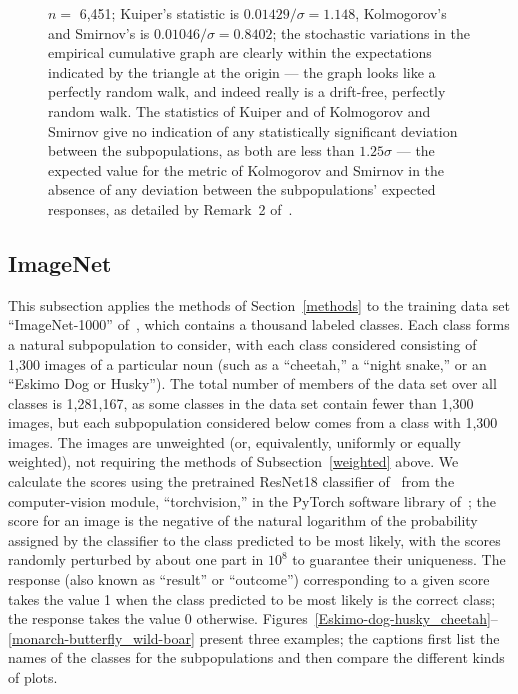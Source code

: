 \documentclass{article}
\begin{document}
\begin{figure}
\begin{centering}
\end{centering}
\caption{$n =$ 6,451; Kuiper's statistic is $0.01429 / \sigma = 1.148$,
         Kolmogorov's and Smirnov's is $0.01046 / \sigma = 0.8402$;
         the stochastic variations in the empirical cumulative graph
         are clearly within the expectations indicated by the triangle
         at the origin --- the graph looks like a perfectly random walk,
         and indeed really is a drift-free, perfectly random walk.
         The statistics of Kuiper and of Kolmogorov and Smirnov
         give no indication of any statistically significant deviation
         between the subpopulations, as both are less than $1.25 \sigma$ ---
         the expected value for the metric of Kolmogorov and Smirnov
         in the absence of any deviation between the subpopulations'
         expected responses, as detailed by Remark~2 of~\cite{tygert}.
}
\label{ex3}
\end{figure}



\subsection{ImageNet}
\label{imagenetex}

This subsection applies the methods of Section~\ref{methods}
to the training data set ``ImageNet-1000'' of~\cite{imagenet},
which contains a thousand labeled classes.
Each class forms a natural subpopulation to consider,
with each class considered consisting of 1,300 images of a particular noun
(such as a ``cheetah,'' a ``night snake,'' or an ``Eskimo Dog or Husky'').
The total number of members of the data set over all classes is 1,281,167,
as some classes in the data set contain fewer than 1,300 images,
but each subpopulation considered below comes from a class with 1,300 images.
The images are unweighted (or, equivalently, uniformly or equally weighted),
not requiring the methods of Subsection~\ref{weighted} above.
We calculate the scores using the pretrained ResNet18 classifier
of~\cite{he-zhang-ren-sun} from the computer-vision module, ``torchvision,''
in the PyTorch software library of~\cite{pytorch};
the score for an image is the negative of the natural logarithm
of the probability assigned by the classifier
to the class predicted to be most likely,
with the scores randomly perturbed by about one part in $10^8$ to guarantee
their uniqueness.
The response (also known as ``result'' or ``outcome'') corresponding
to a given score takes the value 1 when the class predicted to be most likely
is the correct class; the response takes the value 0 otherwise.
Figures~\ref{Eskimo-dog-husky_cheetah}--\ref{monarch-butterfly_wild-boar}
present three examples; the captions first list the names of the classes
for the subpopulations and then compare the different kinds of plots.
\end{document}
